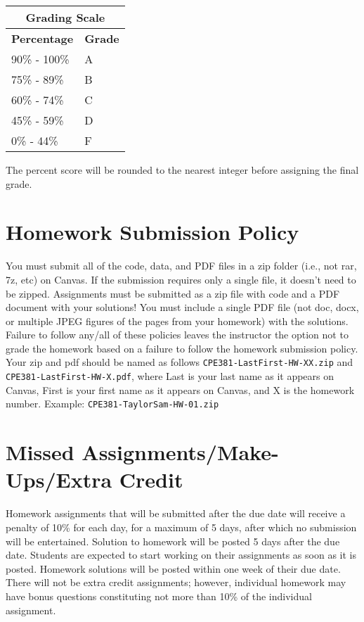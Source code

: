 \documentclass[12pt,nohyper,nobib,xcolor=dvipsnames,svgnames,x11names]{tufte-book}
\begin{document}
\begin{tabular}{|p{3cm}|p{3cm}|}
\hline
\multicolumn{2}{|c|}{\textbf{Grading Scale}} \\ \hline
\textbf{Percentage} & \textbf{Grade} \\ \hline
90\% - 100\% & A \\ \hline
75\% - 89\% & B \\ \hline
60\% - 74\% & C \\ \hline
45\% - 59\% & D \\ \hline
0\% - 44\% & F \\ \hline
\end{tabular}

The percent score will be rounded to the nearest integer before assigning the final grade.



\section*{Homework Submission Policy}
You must submit all of the code, data, and PDF files in a zip folder (i.e., not rar, 7z, etc) on Canvas. If the submission requires only a single file, it doesn't need to be zipped. Assignments must be submitted as a zip file with code and a PDF document with your solutions!  You must include a single PDF file (not doc, docx, or multiple JPEG figures of the pages from your homework) with the solutions. Failure to follow any/all of these policies leaves the instructor the option not to grade the homework based on a failure to follow the homework submission policy. Your zip and pdf should be named as follows \texttt{CPE381-LastFirst-HW-XX.zip} and \texttt{CPE381-LastFirst-HW-X.pdf}, where Last is your last name as it appears on Canvas, First is your first name as it appears on Canvas, and X is the homework number. Example: \texttt{CPE381-TaylorSam-HW-01.zip}

\section{Missed Assignments/Make-Ups/Extra Credit}

Homework assignments that will be submitted after the due date will receive a penalty of 10\% for each day, for a maximum of 5 days, after which no submission will be entertained. Solution to homework will be posted 5 days after the due date.  Students are expected to start working on their assignments as soon as it is posted. Homework solutions will be posted within one week of their due date. There will not be extra credit assignments; however, individual homework may have bonus questions constituting not more than 10\% of the individual assignment.
\end{document}
